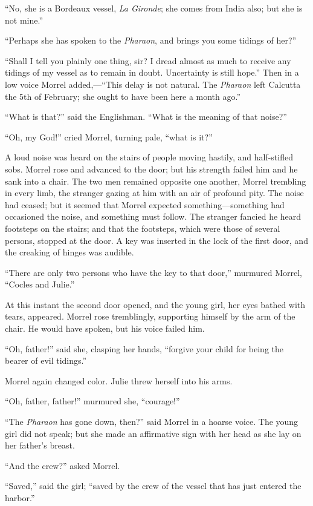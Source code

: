 “No, she is a Bordeaux vessel, \textit{La Gironde}; she comes from India also;
but she is not mine.”

“Perhaps she has spoken to the \textit{Pharaon}, and brings you some tidings
of her?”

“Shall I tell you plainly one thing, sir? I dread almost as much to
receive any tidings of my vessel as to remain in doubt. Uncertainty is
still hope.” Then in a low voice Morrel added,—“This delay is not
natural. The \textit{Pharaon} left Calcutta the 5th of February; she ought to
have been here a month ago.”

“What is that?” said the Englishman. “What is the meaning of that
noise?”

“Oh, my God!” cried Morrel, turning pale, “what is it?”

A loud noise was heard on the stairs of people moving hastily, and
half-stifled sobs. Morrel rose and advanced to the door; but his
strength failed him and he sank into a chair. The two men remained
opposite one another, Morrel trembling in every limb, the stranger
gazing at him with an air of profound pity. The noise had ceased; but
it seemed that Morrel expected something—something had occasioned the
noise, and something must follow. The stranger fancied he heard
footsteps on the stairs; and that the footsteps, which were those of
several persons, stopped at the door. A key was inserted in the lock of
the first door, and the creaking of hinges was audible.

“There are only two persons who have the key to that door,” murmured
Morrel, “Cocles and Julie.”

At this instant the second door opened, and the young girl, her eyes
bathed with tears, appeared. Morrel rose tremblingly, supporting
himself by the arm of the chair. He would have spoken, but his voice
failed him.

“Oh, father!” said she, clasping her hands, “forgive your child for
being the bearer of evil tidings.”

Morrel again changed color. Julie threw herself into his arms.

“Oh, father, father!” murmured she, “courage!”

“The \textit{Pharaon} has gone down, then?” said Morrel in a hoarse voice. The
young girl did not speak; but she made an affirmative sign with her
head as she lay on her father’s breast.

“And the crew?” asked Morrel.

“Saved,” said the girl; “saved by the crew of the vessel that has just
entered the harbor.”


